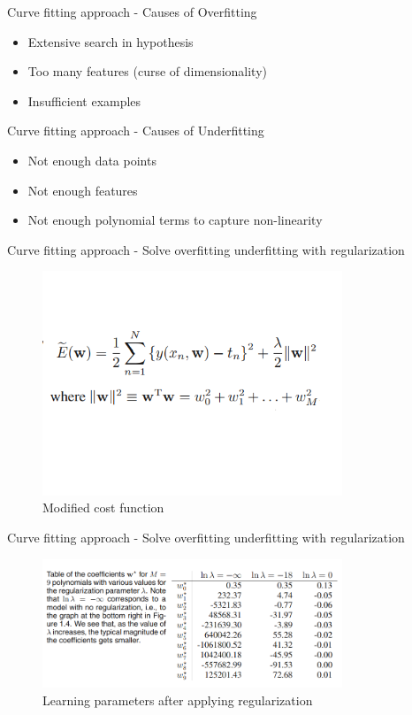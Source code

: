 \documentclass{beamer}
\begin{document}
\begin{frame}{ Curve fitting approach - Causes of Overfitting }
\begin{itemize}
\item Extensive search in hypothesis 
\item Too many features (curse of dimensionality)
\item Insufficient examples
\end{itemize}
\end{frame}

\begin{frame}{ Curve fitting approach - Causes of Underfitting }
\begin{itemize}
\item Not enough data points
\item Not enough features 
\item Not enough polynomial terms to capture non-linearity
\end{itemize}
\end{frame}

\begin{frame}{ Curve fitting approach - Solve overfitting underfitting with regularization }
 \begin{figure}
  \centering
    \includegraphics[width=0.8\textwidth]{regularization}
  		\caption{ Modified cost function }
    \label{regularization}
 \end{figure}
\end{frame}

\begin{frame}{ Curve fitting approach - Solve overfitting underfitting with regularization }
 \begin{figure}
  \centering
    \includegraphics[width=0.8\textwidth]{tablereg}
  		\caption{ Learning parameters after applying regularization }
    \label{tablereg}
 \end{figure}
\end{frame}
\end{document}
